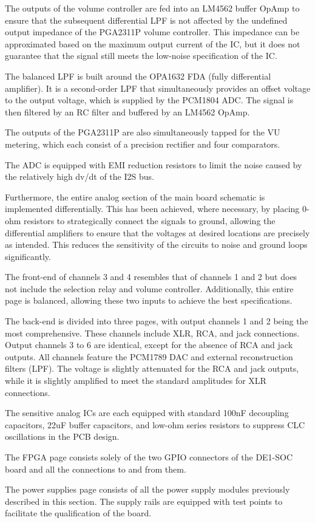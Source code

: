 The outputs of the volume controller are fed into an LM4562 buffer OpAmp to ensure that the subsequent differential LPF is not affected by the undefined output impedance of the PGA2311P volume controller. This impedance can be approximated based on the maximum output current of the IC, but it does not guarantee that the signal still meets the low-noise specification of the IC.

The balanced LPF is built around the OPA1632 FDA (fully differential amplifier). It is a second-order LPF that simultaneously provides an offset voltage to the output voltage, which is supplied by the PCM1804 ADC. The signal is then filtered by an RC filter and buffered by an LM4562 OpAmp.

The outputs of the PGA2311P are also simultaneously tapped for the VU metering, which each consist of a precision rectifier and four comparators.

The ADC is equipped with EMI reduction resistors to limit the noise caused by the relatively high dv/dt of the I2S bus.


Furthermore, the entire analog section of the main board schematic is implemented differentially. This has been achieved, where necessary, by placing 0-ohm resistors to strategically connect the signals to ground, allowing the differential amplifiers to ensure that the voltages at desired locations are precisely as intended. 
This reduces the sensitivity of the circuits to noise and ground loops significantly.

The front-end of channels 3 and 4 resembles that of channels 1 and 2 but does not include the selection relay and volume controller. Additionally, this entire page is balanced, allowing these two inputs to achieve the best specifications.

The back-end is divided into three pages, with output channels 1 and 2 being the most comprehensive. These channels include XLR, RCA, and jack connections. Output channels 3 to 6 are identical, except for the absence of RCA and jack outputs. All channels feature the PCM1789 DAC and external reconstruction filters (LPF). The voltage is slightly attenuated for the RCA and jack outputs, while it is slightly amplified to meet the standard amplitudes for XLR connections.

The sensitive analog ICs are each equipped with standard 100nF decoupling capacitors, 22uF buffer capacitors, and low-ohm series resistors to suppress CLC oscillations in the PCB design.

The FPGA page consists solely of the two GPIO connectors of the DE1-SOC board and all the connections to and from them.

The power supplies page consists of all the power supply modules previously described in this section. The supply rails are equipped with test points to facilitate the qualification of the board.